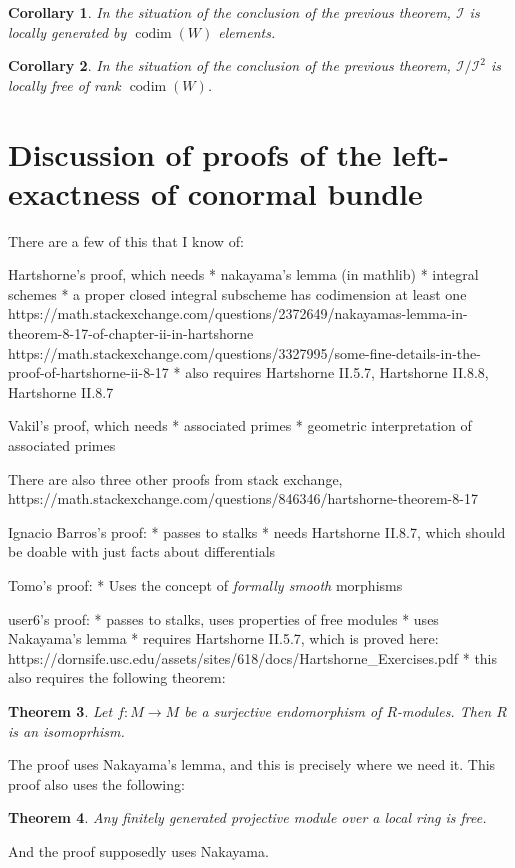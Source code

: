 \documentclass[a4paper]{article}
\newtheorem{thm}{Theorem}[section]
\newtheorem{cor}[thm]{Corollary}
\newcommand{\codim}{\operatorname{codim}}
\newcommand{\conormal}{\mathscr{I} / \mathscr{I}^{2}}
\begin{document}
\begin{cor}
	In the situation of the conclusion of the previous theorem, 
	\(\mathscr{I}\) is locally generated by 
	\(\codim(W)\) elements.
\end{cor}

\begin{cor}
	In the situation of the conclusion of the previous theorem,
	\(\conormal\) is locally free of rank \(\codim(W)\).
\end{cor}

\section{Discussion of proofs of the left-exactness of conormal bundle}

There are a few of this that I know of:

Hartshorne's proof, which needs
* nakayama's lemma (in mathlib)
* integral schemes
* a proper closed integral subscheme has codimension at least one
https://math.stackexchange.com/questions/2372649/nakayamas-lemma-in-theorem-8-17-of-chapter-ii-in-hartshorne
https://math.stackexchange.com/questions/3327995/some-fine-details-in-the-proof-of-hartshorne-ii-8-17
* also requires Hartshorne II.5.7, Hartshorne II.8.8, Hartshorne II.8.7

Vakil's proof, which needs
* associated primes
* geometric interpretation of associated primes

There are also three other proofs from stack exchange,
https://math.stackexchange.com/questions/846346/hartshorne-theorem-8-17

Ignacio Barros's proof:
* passes to stalks
* needs Hartshorne II.8.7, which should be doable with just 
   facts about differentials

Tomo's proof:
* Uses the concept of \textit{formally smooth} morphisms

user6's proof:
* passes to stalks, uses properties of free modules
* uses Nakayama's lemma
* requires Hartshorne II.5.7, which is proved here:
https://dornsife.usc.edu/assets/sites/618/docs/Hartshorne\_Exercises.pdf
* this also requires the following theorem:
\begin{thm}
	Let \(f: M \to M\) be a surjective endomorphism of \(R\)-modules.
	Then \(R\) is an isomoprhism.
\end{thm}
The proof uses Nakayama's lemma, and this is precisely where we need it.
This proof also uses the following:
\begin{thm}
	Any finitely generated projective module over a local ring
	is free.
\end{thm}
And the proof supposedly uses Nakayama.
\end{document}

